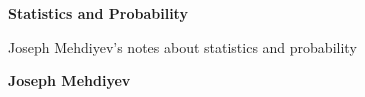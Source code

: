 \begin{titlepage}
    \begin{center}
        \vspace*{1cm}
        \Huge
        \textbf{Statistics and Probability}

        \vspace*{0.5cm}
        \LARGE
        Joseph Mehdiyev's notes about statistics and probability

        \vspace*{1.5cm}

        \textbf{Joseph Mehdiyev}

        \vfill

        \small
    \end{center}
\end{titlepage}
